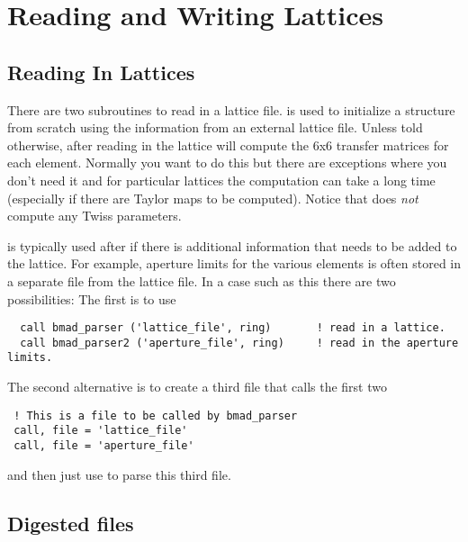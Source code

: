 \chapter{Reading and Writing Lattices}

\section{Reading In Lattices}

There are two subroutines to read in a lattice file.  is
used to initialize a  structure from scratch using the
information from an external lattice file. Unless told otherwise, after
reading in the lattice  will compute the 6x6 transfer
matrices for each element. Normally you want to do this but there are
exceptions where you don't need it and for particular lattices the
computation can take a long time (especially if there are Taylor maps
to be computed). Notice that  does {\em
not} compute any Twiss parameters.

 is typically used after  if there is 
additional information that needs to be added to the lattice.  
For example, aperture limits for the various elements is often
stored in a separate file from the lattice file. In a case such as this
there are two possibilities: The first is to use  
\begin{verbatim}
  call bmad_parser ('lattice_file', ring)       ! read in a lattice.
  call bmad_parser2 ('aperture_file', ring)     ! read in the aperture limits.
\end{verbatim}
The second alternative is to create a third file that calls the first two
\begin{verbatim}
 ! This is a file to be called by bmad_parser
 call, file = 'lattice_file'
 call, file = 'aperture_file'
\end{verbatim}
and then just use  to parse this third file.


\section{Digested files}

